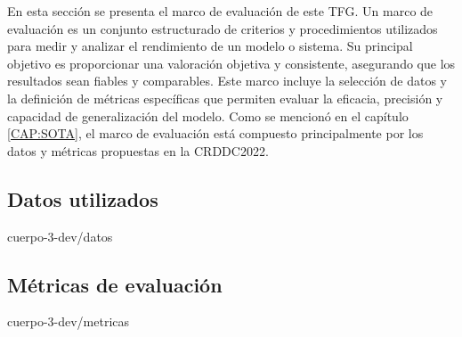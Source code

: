 
En esta sección se presenta el marco de evaluación de este TFG. Un marco de evaluación es un conjunto estructurado de criterios y procedimientos utilizados para medir y analizar el rendimiento de un modelo o sistema. Su principal objetivo es proporcionar una valoración objetiva y consistente, asegurando que los resultados sean fiables y comparables. Este marco incluye la selección de datos y la definición de métricas específicas que permiten evaluar la eficacia, precisión y capacidad de generalización del modelo. Como se mencionó en el capítulo \ref{CAP:SOTA}, el marco de evaluación está compuesto principalmente por los datos y métricas propuestas en la CRDDC2022.

\subsection{Datos utilizados\label{SEC:DATOS}}{cuerpo-3-dev/datos}

\subsection{Métricas de evaluación\label{SEC:METRICAS}}{cuerpo-3-dev/metricas}